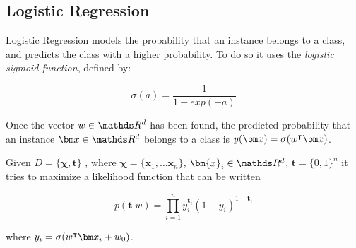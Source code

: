   \subsection{Logistic Regression}
  \label{ssec:log-reg}
  \begin{pre-delivery}
    Logistic Regression\cite{cox1958regression} models the probability that an instance belongs to
    a class, and predicts the class with a higher probability. To do so it
    uses the \textit{logistic sigmoid function}\cite{han1995influence}, defined by:

    \begin{equation}
      \sigma(a) = \frac{1}{1 + exp(-a)}
    \end{equation}

     Once the vector $w \in \reals^d$ has been found, the predicted probability
     that an instance $\vx \in \reals^d$ belongs to a class is
     $y(\vx) = \sigma(w^\transp\vx)$.


     Given
     $D = \{\bm{\chi}, \bm{t}\}$
     , where
     $\bm{\chi} = \{\bm{x}_1, \ldots \bm{x}_n\}$, $\bm{x}_i \in \reals^d$, $\bm{t} = \{0, 1\}^n$
     it tries to maximize a likelihood function that can be written

     \begin{equation}
       p(\bm{t} | w) = \prod_{i = 1}^n y_i^{\bm{t}_i} (1 - y_i)^{1 - \bm{t}_i}
     \end{equation}

     where $y_i = \sigma(w^\transp\vx_i + w_0)$.

  \end{pre-delivery}
